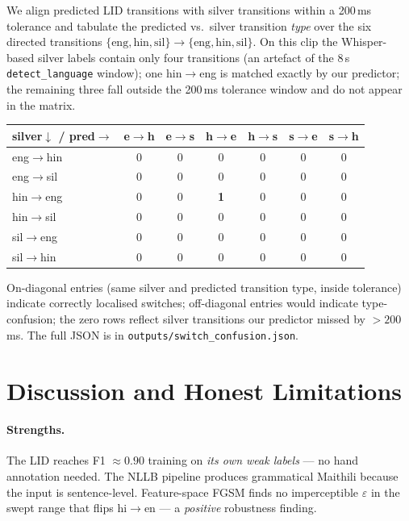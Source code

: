 \documentclass[conference]{IEEEtran}
\begin{document}
We align predicted LID transitions with silver transitions within a 200\,ms
tolerance and tabulate the predicted vs.\ silver transition \emph{type}
over the six directed transitions $\{\text{eng},\text{hin},\text{sil}\}
\!\rightarrow\!\{\text{eng},\text{hin},\text{sil}\}$. On this clip the
Whisper-based silver labels contain only four transitions (an artefact of
the 8\,s \texttt{detect\_language} window); one hin$\to$eng is matched
exactly by our predictor; the remaining three fall outside the 200\,ms
tolerance window and do not appear in the matrix.

\begin{center}
\scriptsize
\setlength{\tabcolsep}{3pt}
\begin{tabular}{@{}l|c c c c c c@{}}
\toprule
\textbf{silver$\downarrow$ / pred$\rightarrow$} & e$\to$h & e$\to$s & h$\to$e & h$\to$s & s$\to$e & s$\to$h \\
\midrule
eng$\to$hin & 0 & 0 & 0 & 0 & 0 & 0 \\
eng$\to$sil & 0 & 0 & 0 & 0 & 0 & 0 \\
hin$\to$eng & 0 & 0 & \textbf{1} & 0 & 0 & 0 \\
hin$\to$sil & 0 & 0 & 0 & 0 & 0 & 0 \\
sil$\to$eng & 0 & 0 & 0 & 0 & 0 & 0 \\
sil$\to$hin & 0 & 0 & 0 & 0 & 0 & 0 \\
\bottomrule
\end{tabular}
\end{center}

\noindent On-diagonal entries (same silver and predicted transition type,
inside tolerance) indicate correctly localised switches; off-diagonal
entries would indicate type-confusion; the zero rows reflect silver
transitions our predictor missed by $>\!200$\,ms. The full JSON is in
\texttt{outputs/switch\_confusion.json}.

\section{Discussion and Honest Limitations}

\paragraph*{Strengths.} The LID reaches F1 $\approx 0.90$ training on
\emph{its own weak labels} --- no hand annotation needed. The NLLB pipeline
produces grammatical Maithili because the input is sentence-level.
Feature-space FGSM finds no imperceptible $\varepsilon$ in the swept range
that flips hi$\rightarrow$en --- a \emph{positive} robustness finding.
\end{document}
